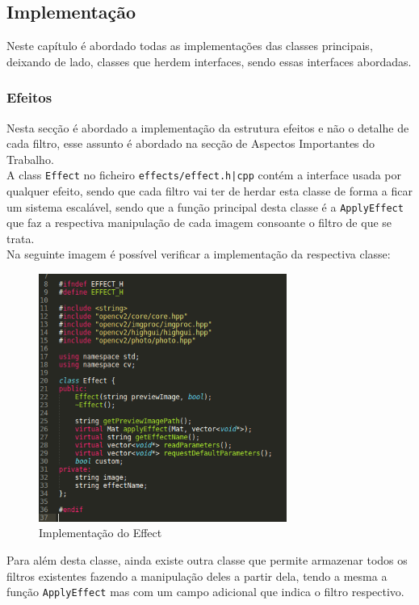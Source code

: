 \documentclass[portugues,final]{revdetua}
\begin{document}
\subsection{Implementação}

Neste capítulo é abordado todas as implementações das classes principais, deixando de lado, classes que herdem interfaces, sendo essas interfaces abordadas.

\subsubsection{Efeitos}

Nesta secção é abordado a implementação da estrutura efeitos e não o detalhe de cada filtro, esse assunto é abordado na secção de Aspectos Importantes do Trabalho.\\

A class {\tt Effect} no ficheiro {\tt effects/effect.{h|c}pp} contém a interface usada por qualquer efeito, sendo que cada filtro vai ter de herdar esta classe de forma a ficar um sistema escalável, sendo que a função principal desta classe é a {\tt ApplyEffect} que faz a respectiva manipulação de cada imagem consoante o filtro de que se trata.\\

Na seguinte imagem é possível verificar a implementação da respectiva classe:

\begin{figure}[h]
\centerline{\includegraphics[width=230pt]{images/effect.png}}
\caption{Implementação do Effect}
\label{img:complete}
\end{figure}

Para além desta classe, ainda existe outra classe que permite armazenar todos os filtros existentes fazendo a manipulação deles a partir dela, tendo a mesma a função {\tt ApplyEffect} mas com um campo adicional que indica o filtro respectivo.\\
\end{document}
